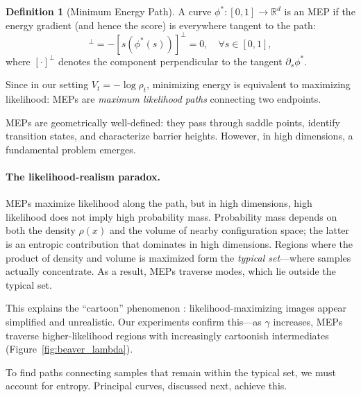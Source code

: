 \documentclass{article}
\theoremstyle{plain}
\theoremstyle{definition}
\newtheorem{definition}[theorem]{Definition}
\theoremstyle{remark}
\begin{document}
\begin{propbox}
\begin{definition}[Minimum Energy Path]
A curve $\phi^*: [0,1] \to \mathbb{R}^d$ is an MEP if the energy gradient (and hence the score) is everywhere tangent to the path:
\begin{equation*}
    [\nabla V(\phi^*(s))]^\perp = -[s(\phi^*(s))]^\perp = 0, \quad \forall s \in [0,1],
\end{equation*}
where $[\cdot]^\perp$ denotes the component perpendicular to the tangent $\partial_s \phi^*$.
\end{definition}
\end{propbox}
Since in our setting $V_t = -\log \rho_t$, minimizing energy is equivalent to maximizing likelihood: MEPs are \emph{maximum likelihood paths} connecting two endpoints.

MEPs are geometrically well-defined: they pass through saddle points, identify transition states, and characterize barrier heights. However, in high dimensions, a fundamental problem emerges.

\begin{pinkbox}
\paragraph{The likelihood-realism paradox.} MEPs maximize likelihood along the path, but in high dimensions, high likelihood does not imply high probability mass. Probability mass depends on both the density $\rho(x)$ and the volume of nearby configuration space; the latter is an entropic contribution that dominates in high dimensions. Regions where the product of density and volume is maximized form the \emph{typical set}---where samples actually concentrate.\footnotemark{} As a result, MEPs traverse modes, which lie outside the typical set.
\end{pinkbox}

This explains the ``cartoon'' phenomenon \citep{guth2025learning, karczewski2025diffusion}: likelihood-maximizing images appear simplified and unrealistic. Our experiments confirm this---as $\gamma$ increases, MEPs traverse higher-likelihood regions with increasingly cartoonish intermediates (Figure~\ref{fig:beaver_lambda}).

To find paths connecting samples that remain within the typical set, we must account for entropy. Principal curves, discussed next, achieve this.
\end{document}
